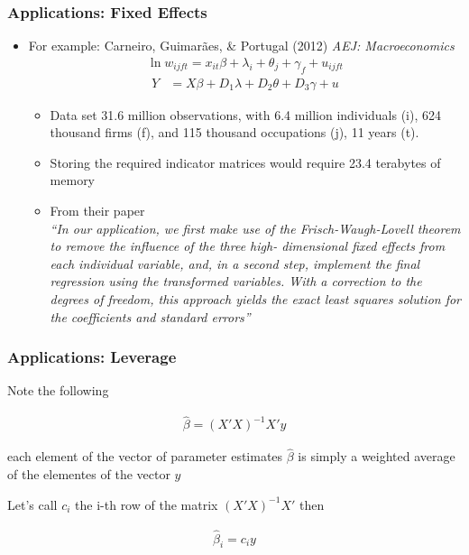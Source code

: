 \documentclass[
  shownotes,
  xcolor={svgnames},
  hyperref={colorlinks,citecolor=DarkBlue,linkcolor=DarkRed,urlcolor=DarkBlue}
  ]{beamer}
\begin{document}
\begin{frame}
\frametitle{Applications: Fixed Effects}

\begin{itemize}
\item For example: Carneiro, Guimarães, \& Portugal (2012) {\it AEJ: Macroeconomics}
  \begin{align}
  \ln w_{ijft} = x_{it} \beta + \lambda_i +\theta_j +\gamma_f + u_{ijft}
  \end{align}
  \begin{align}
  Y &= X\beta + D_1 \lambda + D_2 \theta + D_3 \gamma+ u 
  \end{align}

  \begin{itemize}
    \item Data set  31.6 million observations, with 6.4 million individuals (i), 624 thousand firms (f), and 115 thousand occupations (j), 11 years (t).
    \item Storing the required indicator matrices would require 23.4 terabytes of memory
    \item From their paper  \\
    \footnotesize
    {\it ``In our application, we first make use of the Frisch-Waugh-Lovell theorem to remove the influence of the three high- dimensional fixed effects from each individual variable, and, in a second step, implement the final regression using the transformed variables. With a correction to the degrees of freedom, this approach yields the exact least squares solution for the coefficients and standard errors''}

  \end{itemize}
\end{itemize}
\end{frame}


\begin{frame}
\frametitle{Applications: Leverage}
Note the following 

\begin{align}
\hat \beta=(X'X)^{-1}X'y
\end{align}

each element of the vector of parameter estimates $\hat \beta$ is simply a weighted average of the elementes of the vector $y$

Let's call $c_i$ the {i-th} row of the matrix $(X'X)^{-1}X'$ then

\begin{align}
\hat \beta_i=c_i y
\end{align}


\end{frame}
\end{document}

